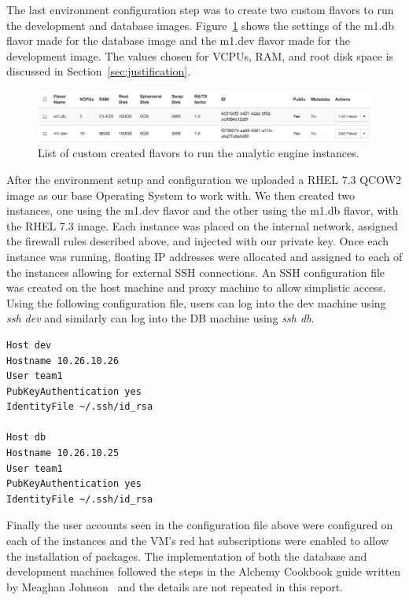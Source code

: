 The last environment configuration step was to create two custom flavors
to run the development and database images. Figure~\ref{fig:flavors}
shows the settings of the m1.db flavor made for the database image and
the m1.dev flavor made for the development image. The values chosen for
VCPUs, RAM, and root disk space is discussed in
Section~\ref{sec:justification}.

\begin{figure}[H]
  \centering
  \includegraphics[scale=0.40]{img/flavors}
  \caption{List of custom created flavors to run the analytic engine
instances.}
  \label{fig:flavors}
\end{figure}

After the environment setup and configuration we uploaded a RHEL 7.3
QCOW2 image as our base Operating System to work with. We then created
two instances, one using the m1.dev flavor and the other using the m1.db
flavor, with the RHEL 7.3 image. Each instance was placed on the internal
network, assigned the firewall rules described above, and injected with
our private key. Once each instance was running, floating IP addresses
were allocated and assigned to each of the instances allowing for
external SSH connections. An SSH configuration file was created on the
host machine and proxy machine to allow simplistic access. Using the
following configuration file, users can log into the dev machine using
\textit{ssh dev} and similarly can log into the DB machine using
\textit{ssh db}.

\begin{lstlisting}[escapechar=&]
Host dev
Hostname 10.26.10.26
User team1
PubKeyAuthentication yes
IdentityFile ~/.ssh/id_rsa

Host db
Hostname 10.26.10.25
User team1
PubKeyAuthentication yes
IdentityFile ~/.ssh/id_rsa
\end{lstlisting}

Finally the user accounts seen in the configuration file above were
configured on each of the instances and the VM's red hat subscriptions
were enabled to allow the installation of packages. The implementation
of both the database and development machines followed the steps in the
Alchemy Cookbook guide written by Meaghan Johnson~\cite{alchemy} and
the details are not repeated in this report. 
